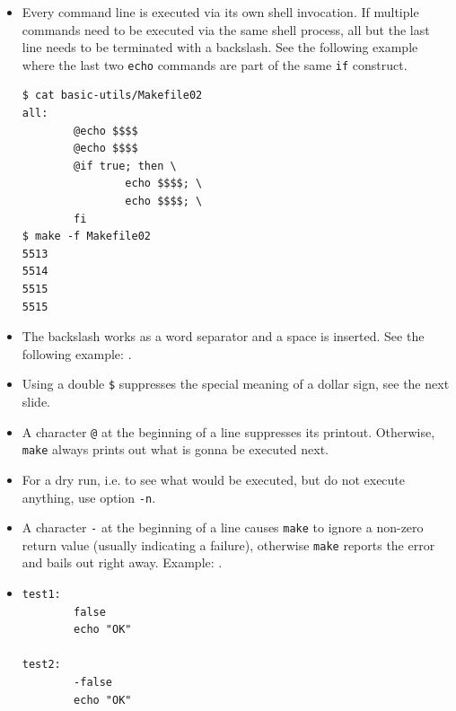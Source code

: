 \begin{itemize}
\item {}  Every command line is executed via its own shell invocation.  If
multiple commands need to be executed via the same shell process, all but the
last line needs to be terminated with a backslash.  See the following example
where the last two \texttt{echo} commands are part of the same \texttt{if}
construct.

\begin{verbatim}
$ cat basic-utils/Makefile02
all:
        @echo $$$$
        @echo $$$$
        @if true; then \
                echo $$$$; \
                echo $$$$; \
        fi
$ make -f Makefile02
5513
5514
5515
5515
\end{verbatim}

\item The backslash works as a word separator and a space is inserted.  See
the following example: .
\item Using a double \texttt{\$} suppresses the special meaning of a dollar
sign, see the next slide.
\item A character \texttt{@} at the beginning of a line suppresses its printout.
Otherwise, \texttt{make} always prints out what is gonna be executed next.
\item For a dry run, i.e. to see what would be executed, but do not execute
anything, use option \texttt{-n}.
\item A character \texttt{-} at the beginning of a line causes \texttt{make} to
ignore a non-zero return value (usually indicating a failure), otherwise
\texttt{make} reports the error and bails out right away.  Example:
\example{basic-utils/Makefile04}.
\item 
\begin{verbatim}
test1:
        false
        echo "OK"

test2:
        -false
        echo "OK"
\end{verbatim}
\end{itemize}


